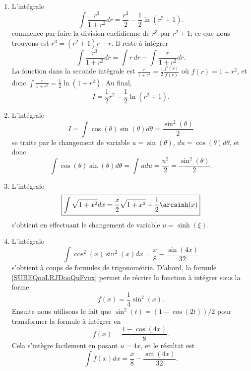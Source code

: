\begin{enumerate}
	\item
	      L'intégrale
	      \begin{equation}
		      \boxed{\int \frac{ r^3 }{ 1+r^2 }dr=\frac{ r^2 }{2}-\frac{ 1 }{2}\ln(r^2+1).}
	      \end{equation}
	      commence par faire la division euclidienne de \( r^3\) par \( r^2+1\); ce que nous trouvons est \( r^3=(r^2+1)r-r\). Il reste à intégrer
	      \begin{equation}
		      \int \frac{ r^3 }{ 1+r^2 }dr=\int r\,dr-\int\frac{ r }{ 1+r^2 }dr.
	      \end{equation}
	      La fonction dans la seconde intégrale est \( \frac{ r }{ 1+r^2 }=\frac{ 1 }{2}\frac{ f'(r) }{ f(r) }\) où \( f(r)=1+r^2\), et donc \( \int \frac{ r }{ 1+r^2 }=\frac{ 1 }{2}\ln(1+r^2)\). Au final,
	      \begin{equation}
		      I=\frac{ 1 }{2}r^2-\frac{ 1 }{2}\ln(r^2+1).
	      \end{equation}


	\item
	      L'intégrale
	      \begin{equation}	\label{EqTrucIntsxcxdx}
		      \boxed{I=\int \cos(\theta)\sin(\theta)d\theta=\frac{ \sin^2(\theta) }{ 2 }}
	      \end{equation}
	      se traite par le changement de variable \( u=\sin(\theta)\), \( du=\cos(\theta)d\theta\), et donc
	      \begin{equation}
		      \int\cos(\theta)\sin(\theta)d\theta=\int udu=\frac{ u^2 }{2}=\frac{ \sin^2(\theta) }{ 2 }.
	      \end{equation}
	\item
	      L'intégrale
	      \begin{equation}	\label{EqTrucsIntsqrtAplusu}
		      \boxed{\int\sqrt{1+x^2}dx=\frac{ x }{2}\sqrt{1+x^2}+\frac{ 1 }{2}\arcsinh(x)}
	      \end{equation}
	      s'obtient en effectuant le changement de variable \( u=\sinh(\xi)\).

	\item
	      L'intégrale
	      \begin{equation}        \label{EqTrucIntcossqsinsq}
		      \boxed{ \int\cos^2(x)\sin^2(x)dx=\frac{ x }{ 8 }-\frac{ \sin(4x) }{ 32 } }
	      \end{equation}
	      s'obtient à coups de formules de trigonométrie. D'abord, la formule \eqref{SUBEQooLRJDooQuFvux} permet de récrire la fonction à intégrer sous la forme
	      \begin{equation}
		      f(x)=\frac{1}{ 4 }\sin^2(x).
	      \end{equation}
	      Ensuite nous utilisons le fait que \( \sin^2(t)=(1-\cos(2t))/2\) pour transformer la formule à intégrer en
	      \begin{equation}
		      f(x)=\frac{ 1-\cos(4x) }{ 8 }.
	      \end{equation}
	      Cela s'intègre facilement en posant \( u=4x\), et le résultat est
	      \begin{equation}
		      \int f(x)dx=\frac{ x }{ 8 }-\frac{ \sin(4x) }{ 32 }.
	      \end{equation}


\end{enumerate}
